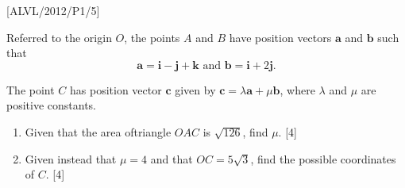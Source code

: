 \item {[}ALVL/2012/P1/5{]}

Referred to the origin $O$, the points $A$ and $B$ have position
vectors $\mathbf{a}$ and $\mathbf{b}$ such that 
\[
\mathbf{a}=\mathbf{i}-\mathbf{j}+\mathbf{k}\,\,\text{and}\,\,\mathbf{b}=\mathbf{i}+2\mathbf{j}.
\]

The point $C$ has position vector $\mathbf{c}$ given by $\mathbf{c}=\lambda\mathbf{a}+\mu\mathbf{b}$,
where $\lambda$ and $\mu$ are positive constants.
\begin{enumerate}
\item Given that the area oftriangle $OAC$ is $\sqrt{126}$, find $\mu$.
\hfill{} {[}4{]}
\item Given instead that $\mu=4$ and that $OC=5\sqrt{3}$, find the possible
coordinates of $C$. \hfill{} {[}4{]}
\end{enumerate}
